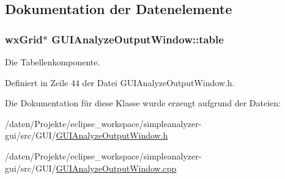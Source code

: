 \subsection{Dokumentation der Datenelemente}
\hypertarget{classGUIAnalyzeOutputWindow_afa1bc15fd767bfb9922e880403fb4305}{
\subsubsection[{table}]{\setlength{\rightskip}{0pt plus 5cm}wx\-Grid$\ast$ G\-U\-I\-Analyze\-Output\-Window\-::table\hspace{0.3cm}{\ttfamily [private]}}}\label{classGUIAnalyzeOutputWindow_afa1bc15fd767bfb9922e880403fb4305}


Die Tabellenkomponente. 



Definiert in Zeile 44 der Datei G\-U\-I\-Analyze\-Output\-Window.\-h.



Die Dokumentation für diese Klasse wurde erzeugt aufgrund der Dateien\-:\begin{DoxyCompactItemize}
\item 
/daten/\-Projekte/eclipse\-\_\-workspace/simpleanalyzer-\/gui/src/\-G\-U\-I/\hyperlink{GUIAnalyzeOutputWindow_8h}{G\-U\-I\-Analyze\-Output\-Window.\-h}\item 
/daten/\-Projekte/eclipse\-\_\-workspace/simpleanalyzer-\/gui/src/\-G\-U\-I/\hyperlink{GUIAnalyzeOutputWindow_8cpp}{G\-U\-I\-Analyze\-Output\-Window.\-cpp}\end{DoxyCompactItemize}
